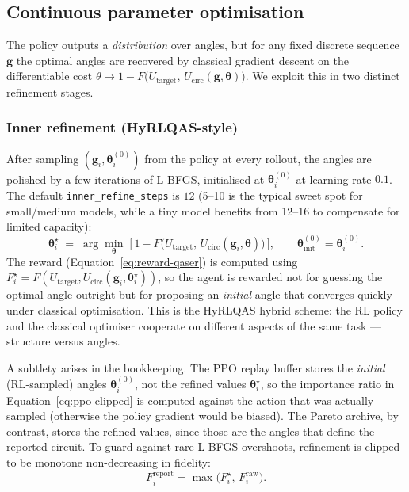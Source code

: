 \documentclass[11pt,a4paper]{article}
\newcommand{\Utarget}{U_{\text{target}}}
\newcommand{\Ucirc}{U_{\text{circ}}}
\begin{document}
\subsection{Continuous parameter optimisation}
\label{sec:angle-opt}

The policy outputs a \emph{distribution} over angles, but for any fixed discrete sequence $\bm{g}$ the optimal angles are recovered by classical gradient descent on the differentiable cost $\theta \mapsto 1 - F\bigl(\Utarget,\,\Ucirc(\bm{g}, \bm{\theta})\bigr)$. We exploit this in two distinct refinement stages.

\subsubsection{Inner refinement (HyRLQAS-style)}

After sampling $(\bm{g}_i, \bm{\theta}_i^{(0)})$ from the policy at every rollout, the angles are polished by a few iterations of L-BFGS, initialised at $\bm{\theta}_i^{(0)}$ at learning rate $0.1$. The default \texttt{inner\_refine\_steps} is $12$ (5--10 is the typical sweet spot for small/medium models, while a tiny model benefits from 12--16 to compensate for limited capacity):
\begin{equation}
\bm{\theta}_i^{\star}
\;=\;
\arg\min_{\bm{\theta}}\;
\bigl[\,1 - F\bigl(\Utarget,\,\Ucirc(\bm{g}_i, \bm{\theta})\bigr)\,\bigr],
\qquad
\bm{\theta}^{(0)}_{\text{init}} = \bm{\theta}^{(0)}_i.
\end{equation}
The reward (Equation~\ref{eq:reward-qaser}) is computed using $F^{\star}_i = F(\Utarget, \Ucirc(\bm{g}_i, \bm{\theta}_i^{\star}))$, so the agent is rewarded not for guessing the optimal angle outright but for proposing an \emph{initial} angle that converges quickly under classical optimisation. This is the HyRLQAS hybrid scheme: the RL policy and the classical optimiser cooperate on different aspects of the same task --- structure versus angles.

A subtlety arises in the bookkeeping. The PPO replay buffer stores the \emph{initial} (RL-sampled) angles $\bm{\theta}_i^{(0)}$, not the refined values $\bm{\theta}_i^{\star}$, so the importance ratio in Equation~\ref{eq:ppo-clipped} is computed against the action that was actually sampled (otherwise the policy gradient would be biased). The Pareto archive, by contrast, stores the refined values, since those are the angles that define the reported circuit. To guard against rare L-BFGS overshoots, refinement is clipped to be monotone non-decreasing in fidelity:
\[
F_i^{\text{report}} = \max\bigl(F_i^{\star},\, F_i^{\text{raw}}\bigr).
\]
\end{document}
